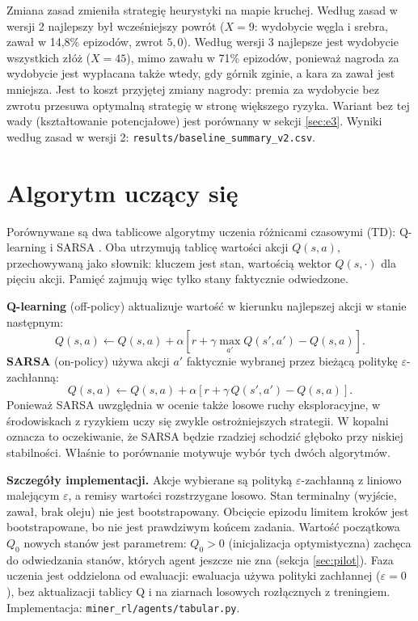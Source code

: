 \documentclass[11pt,a4paper]{article}
\begin{document}
Zmiana zasad zmieniła strategię heurystyki na mapie kruchej. Według zasad w wersji 2
najlepszy był wcześniejszy powrót ($X=9$: wydobycie węgla i srebra, zawał w 14,8\%
epizodów, zwrot $5{,}0$). Według wersji 3 najlepsze jest wydobycie wszystkich złóż
($X=45$), mimo zawału w 71\% epizodów, ponieważ nagroda za wydobycie jest wypłacana
także wtedy, gdy górnik zginie, a kara za zawał jest mniejsza. Jest to koszt
przyjętej zmiany nagrody: premia za wydobycie bez zwrotu przesuwa optymalną strategię
w stronę większego ryzyka. Wariant bez tej wady (kształtowanie potencjałowe) jest
porównany w sekcji \ref{sec:e3}. Wyniki według zasad w wersji 2:
\texttt{results/baseline\_summary\_v2.csv}.

\section{Algorytm uczący się}
Porównywane są dwa tablicowe algorytmy uczenia różnicami czasowymi (TD):
Q-learning i SARSA \cite{sutton}. Oba utrzymują tablicę wartości akcji
$Q(s,a)$, przechowywaną jako słownik: kluczem jest stan, wartością wektor
$Q(s,\cdot)$ dla pięciu akcji. Pamięć zajmują więc tylko stany faktycznie
odwiedzone.

\textbf{Q-learning} (off-policy) aktualizuje wartość w kierunku najlepszej akcji
w stanie następnym:
\[
  Q(s,a) \leftarrow Q(s,a) + \alpha\left[r + \gamma \max_{a'} Q(s',a') - Q(s,a)\right].
\]
\textbf{SARSA} (on-policy) używa akcji $a'$ faktycznie wybranej przez bieżącą
politykę $\varepsilon$-zachłanną:
\[
  Q(s,a) \leftarrow Q(s,a) + \alpha\left[r + \gamma\, Q(s',a') - Q(s,a)\right].
\]
Ponieważ SARSA uwzględnia w ocenie także losowe ruchy eksploracyjne, w
środowiskach z ryzykiem uczy się zwykle ostrożniejszych strategii. W kopalni
oznacza to oczekiwanie, że SARSA będzie rzadziej schodzić głęboko przy niskiej
stabilności. Właśnie to porównanie motywuje wybór tych dwóch algorytmów.

\textbf{Szczegóły implementacji.} Akcje wybierane są polityką
$\varepsilon$-zachłanną z liniowo malejącym $\varepsilon$, a remisy wartości
rozstrzygane losowo. Stan terminalny (wyjście, zawał, brak oleju) nie jest
bootstrapowany. Obcięcie epizodu limitem kroków jest bootstrapowane, bo nie jest
prawdziwym końcem zadania. Wartość początkowa $Q_0$ nowych stanów jest
parametrem: $Q_0>0$ (inicjalizacja optymistyczna) zachęca do odwiedzania stanów,
których agent jeszcze nie zna (sekcja \ref{sec:pilot}). Faza uczenia jest oddzielona od ewaluacji: ewaluacja
używa polityki zachłannej ($\varepsilon=0$), bez aktualizacji tablicy Q i na
ziarnach losowych rozłącznych z treningiem. Implementacja:
\texttt{miner\_rl/agents/tabular.py}.
\end{document}
